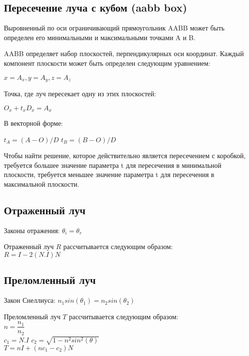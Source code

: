 \subsection*{Пересечение луча с кубом (aabb box)}

Выровненный по оси ограничивающий прямоугольник AABB может быть определен его минимальными и максимальными точками A и B.

AABB определяет набор плоскостей, перпендикулярных оси координат. Каждый компонент плоскости может быть определен следующим уравнением:

$
x = A_x, y = A_y, z = A_z
$

Точка, где луч пересекает одну из этих плоскостей:

$
O_x + t_x D_x = A_x
$

В векторной форме:

$t_A = (A - O) / D$ \quad $t_B = (B - O) / D$

Чтобы найти решение, которое действительно является пересечением с коробкой, требуется большее значение параметра t для пересечения в минимальной плоскости, требуется меньшее значение параметра t для пересечения в максимальной плоскости.


\subsection*{Отраженный луч}

Законы отражения: $\theta_i = \theta_r$

Отраженный луч $R$ рассчитывается следующим образом:\\

$
R = I - 2 (N.I)N
$

\subsection*{Преломленный луч}

Закон Снеллиуса: $n_1 sin(\theta_1) = n_2 sin(\theta_2)$

Преломленный луч $T$ рассчитывается следующим образом:\\

$n = \dfrac{n_1}{n_2}$\\

$c_1 = N.I$\qquad
$c_2 = \sqrt{1-n^2 sin^2(\theta)}$\\

$T = nI + (nc_1 - c_2)N$




